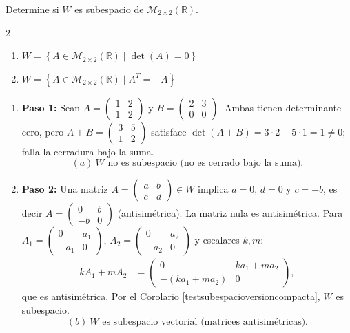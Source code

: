 \begin{example}
Determine si $W$ es subespacio de $\mathcal{M}_{2\times 2}\left(\mathbb{R}\right).$
\begin{multicols}{2}
\begin{enumerate}[$(a)$]
\item $W=\left\lbrace A\in\mathcal{M}_{2\times 2}\left(\mathbb{R}\right) \mid \det(A)=0   \right\rbrace$
\item $W=\left\lbrace A\in\mathcal{M}_{2\times 2}\left(\mathbb{R}\right) \mid  A^T=-A  \right\rbrace$
\end{enumerate}
\end{multicols}
\begin{myproof}
\begin{enumerate}[$(a)$]
\item \textbf{Paso 1:} Sean $A=\begin{pmatrix} 1&2\\1&2 \end{pmatrix}$ y $B=\begin{pmatrix}2&3\\0&0 \end{pmatrix}$. Ambas tienen determinante cero, pero $A+B=\begin{pmatrix} 3&5\\1&2 \end{pmatrix}$ satisface $\det(A+B)=3\cdot 2-5\cdot 1=1\neq 0$; falla la cerradura bajo la suma.
$$\boxed{(a)\ W \text{ no es subespacio (no es cerrado bajo la suma).}}$$

\item \textbf{Paso 2:} Una matriz $A=\begin{pmatrix}a&b\\c&d\end{pmatrix}\in W$ implica $a=0$, $d=0$ y $c=-b$, es decir $A=\begin{pmatrix}0&b\\-b&0\end{pmatrix}$ (antisimétrica). La matriz nula es antisimétrica. Para $A_1=\begin{pmatrix}0&a_1\\-a_1&0\end{pmatrix}$, $A_2=\begin{pmatrix}0&a_2\\-a_2&0\end{pmatrix}$ y escalares $k,m$:
\begin{align*}
kA_1+mA_2&=\begin{pmatrix}0&ka_1+ma_2\\-(ka_1+ma_2)&0\end{pmatrix},
\end{align*}
que es antisimétrica. Por el Corolario \ref{testsubespacioversioncompacta}, $W$ es subespacio.
$$\boxed{(b)\ W \text{ es subespacio vectorial (matrices antisimétricas).}}$$
\end{enumerate}
\end{myproof}
\end{example}


